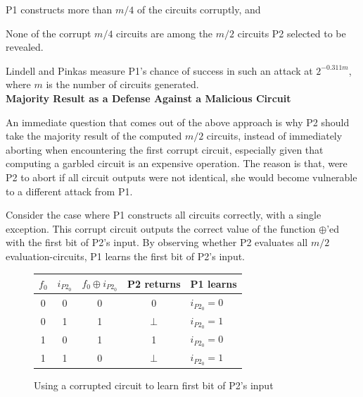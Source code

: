 \begin{enumerate*}
    \item \ac{P1} constructs more than $m/4$ of the circuits corruptly, and
    \item None of the corrupt $m/4$ circuits are among the $m/2$ circuits \ac{P2} selected to be revealed.
\end{enumerate*}

Lindell and Pinkas measure \ac{P1}'s chance of success in such an attack at $2^{-0.311m}$, where $m$ is the number of circuits generated\cite{lindell2007efficient}.\\[.5em]

\noindent\textbf{Majority Result as a Defense Against a Malicious Circuit}

An immediate question that comes out of the above approach is why \ac{P2} should take the majority result of the computed $m/2$ circuits, instead of immediately aborting when encountering the first corrupt circuit, especially given that computing a garbled circuit is an expensive operation.  The reason is that, were \ac{P2} to abort if all circuit outputs were not identical, she would become vulnerable to a different attack from \ac{P1}.

Consider the case where \ac{P1} constructs all circuits correctly, with a single exception.  This corrupt circuit outputs the correct value of the function $\oplus$'ed with the first bit of \ac{P2}'s input.  By observing whether \ac{P2} evaluates all $m/2$ evaluation-circuits, \ac{P1} learns the first bit of \ac{P2}'s input.

\begin{figure}[t]
    \centering
    \begin{tabular}{ c | c | c || c | l }
        \hline
        $f_0$ & $i_{P2_0}$ & $f_0 \oplus i_{P2_0}$ & \ac{P2} returns & \ac{P1} learns \\
        \hline
        0 & 0 & 0 & 0 & $i_{P2_0} = 0$\\
        \hline
        0 & 1 & 1 & $\bot$ & $i_{P2_0} = 1$\\
        \hline
        1 & 0 & 1 & 1 & $i_{P2_0} = 0$\\
        \hline
        1 & 1 & 0 & $\bot$ & $i_{P2_0} = 1$\\
        \hline
    \end{tabular}
    \caption{Using a corrupted circuit to learn first bit of \ac{P2}'s input}
    \label{fig:earlyabortattack}
\end{figure}

